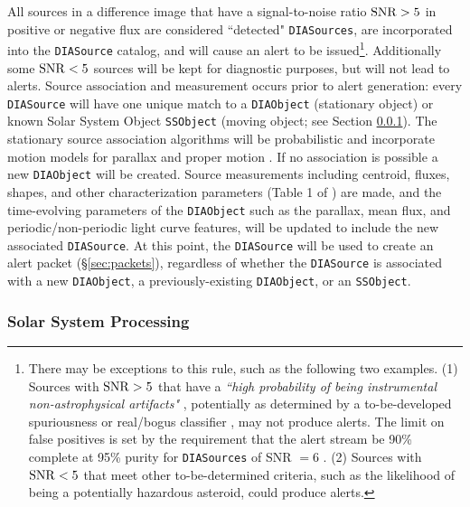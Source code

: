 All sources in a difference image that have a signal-to-noise ratio ${\rm SNR}>5$ in positive or negative flux are considered ``detected" \texttt{DIASources}, are incorporated into the {\tt DIASource} catalog, and will cause an alert to be issued\footnote{
There may be exceptions to this rule, such as the following two examples.
(1) Sources with ${\rm SNR} > 5$ that have a {\it ``high probability of being instrumental non-astrophysical artifacts"} , potentially as determined by
a to-be-developed spuriousness or real/bogus classifier , may not produce alerts.
The limit on false positives is set by the requirement that the alert stream be 90\% complete at 95\% purity for \texttt{DIASources} of SNR $= 6$ .
(2) Sources with ${\rm SNR} < 5$ that meet other to-be-determined criteria, such as the likelihood of being a potentially hazardous asteroid, could produce alerts.}.
Additionally some ${\rm SNR} < 5$ sources will be kept for diagnostic purposes, but will not lead to alerts.
Source association and measurement occurs prior to alert generation: every {\tt DIASource} will have one unique match to a {\tt DIAObject} (stationary object) or known Solar System Object {\tt SSObject} (moving object; see Section \ref{sec:AGP_SSP}).
The stationary source association algorithms will be probabilistic and incorporate motion models for parallax and proper motion .
If no association is possible a new {\tt DIAObject} will be created.
Source measurements including centroid, fluxes, shapes, and other characterization parameters (Table 1 of ) are made, and the time-evolving parameters of the {\tt DIAObject} such as the parallax, mean flux, and periodic/non-periodic light curve features, will be updated to include the new associated {\tt DIASource}.
At this point, the {\tt DIASource} will be used to create an alert packet (\S \ref{sec:packets}), regardless of whether the \texttt{DIASource} is associated with a new \texttt{DIAObject}, a previously-existing \texttt{DIAObject}, or an \texttt{SSObject}.

\subsubsection{Solar System Processing}\label{sec:AGP_SSP}

